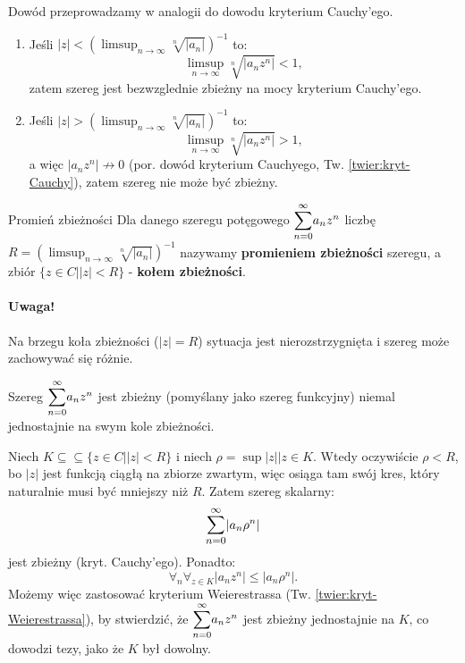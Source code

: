 \documentclass{article}
\numberwithin{defi}{section}
\numberwithin{defi}{section}
\newcommand{\oo}{\infty}
\newcommand{\se}{\subseteq}
\renewcommand{\leq}{\leqslant}
\newcommand{\tb}[1]{\textbf{#1}}
\newcommand{\bsumoo}[1]{\mathlarger{\sum_{#1 = 0}^{\oo}}}
\begin{document}
\begin{dow}{}
    Dowód przeprowadzamy w analogii do dowodu kryterium Cauchy'ego. \begin{enumerate}
        \item Jeśli $|z| < (\limsup_{n \to \oo} \sqrt[n]{|a_n|}) ^{-1}$ to: \begin{equation*}
            \limsup_{n \to \oo} \sqrt[n]{|a_n z^n|} < 1,
        \end{equation*} zatem szereg jest bezwzglednie zbieżny na mocy kryterium Cauchy'ego.
        \item Jeśli  $|z| > (\limsup_{n \to \oo} \sqrt[n]{|a_n|}) ^{-1}$ to: \begin{equation*}
            \limsup_{n \to \oo} \sqrt[n]{|a_n z^n|} > 1,
        \end{equation*} a więc $|a_n z^n| \not\to 0$ (por. dowód kryterium Cauchyego, Tw. \ref{twier:kryt-Cauchy}), zatem szereg nie może być zbieżny.
    \end{enumerate}
\end{dow}


\begin{defr}{Promień zbieżności}
    Dla danego szeregu potęgowego $\bsumoo{n} a_n z^n$ liczbę $R = (\limsup_{n \to \oo} \sqrt[n]{|a_n|}) ^{-1}$ nazywamy \tb{promieniem zbieżności} szeregu, a zbiór $\{ z\in C \big| |z| < R \}$ - \tb{kołem zbieżności}.
\end{defr}

\paragraph{Uwaga!} Na brzegu koła zbieżności ($|z| = R$) sytuacja jest nierozstrzygnięta i szereg może zachowywać się różnie.

\begin{twier}{}
    Szereg $\bsumoo{n} a_n z^n$ jest zbieżny (pomyślany jako szereg funkcyjny) niemal jednostajnie na swym kole zbieżności.
\end{twier}

\begin{dow}{}
    Niech $K \se \se \{ z\in C \big| |z| < R \}$ i niech $\rho = \sup{|z| \big| z \in K}$. Wtedy oczywiście $\rho < R$, bo $|z|$ jest funkcją ciągłą na zbiorze zwartym, więc osiąga tam swój kres, który naturalnie musi być mniejszy niż $R$. Zatem szereg skalarny: \begin{equation*}
        \bsumoo{n} |a_n \rho^n| 
    \end{equation*} jest zbieżny (kryt. Cauchy'ego). Ponadto: \begin{equation*}
        \forall_n \forall_{z \in K} |a_n z^n| \leq |a_n \rho ^n|.
    \end{equation*} Możemy więc zastosować kryterium Weierestrassa (Tw. \ref*{twier:kryt-Weierestrassa}), by stwierdzić, że $\bsumoo{n} a_n z^n$ jest zbieżny jednostajnie na $K$, co dowodzi tezy, jako że $K$ był dowolny.
\end{dow}
\end{document}
